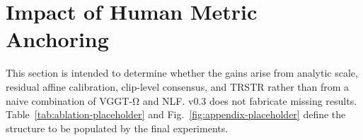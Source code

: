 \begin{table}[H]
\caption{Summary of tasks, datasets, and evaluation boundaries. Exact splits, sample counts, and preprocessing remain to be completed.}
\label{tab:evaluation-protocol}
\centering
\small
{}
\end{table}

\section{Impact of Human Metric Anchoring}
\label{app:ablation}

This section is intended to determine whether the gains arise from analytic scale, residual affine calibration, clip-level consensus, and TRSTR rather than from a naive combination of VGGT-Ω and NLF. v0.3 does not fabricate missing results. Table~\ref{tab:ablation-placeholder} and Fig.~\ref{fig:appendix-placeholder} define the structure to be populated by the final experiments.

